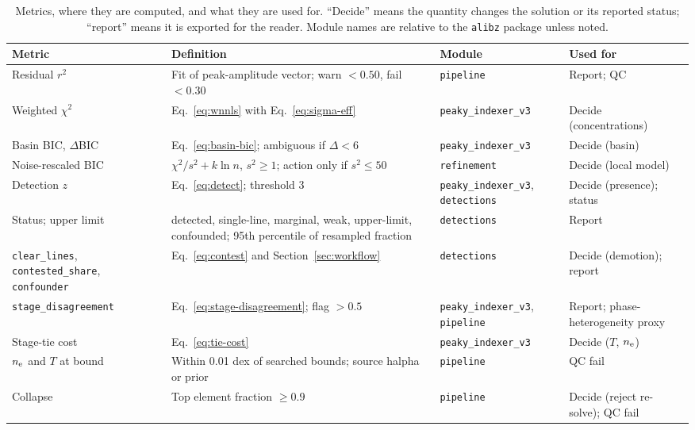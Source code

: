 \begin{table}[t]
\centering
\footnotesize
\setlength{\tabcolsep}{3pt}
\caption{Metrics, where they are computed, and what they are used for. ``Decide'' means the quantity changes the solution or its reported status; ``report'' means it is exported for the reader. Module names are relative to the \texttt{alibz} package unless noted.}
\label{tab:metrics}
\begin{tabular}{@{}p{2.6cm}p{5.0cm}p{2.9cm}p{2.9cm}@{}}
\toprule
Metric & Definition & Module & Used for \\
\midrule
Residual $r^2$ & Fit of peak-amplitude vector; warn $<0.50$, fail $<0.30$ & \texttt{pipeline} & Report; QC \\
Weighted $\chi^2$ & Eq.~\eqref{eq:wnnls} with Eq.~\eqref{eq:sigma-eff} & \texttt{peaky\_\allowbreak indexer\_\allowbreak v3} & Decide (concentrations) \\
Basin BIC, $\Delta$BIC & Eq.~\eqref{eq:basin-bic}; ambiguous if $\Delta<6$ & \texttt{peaky\_\allowbreak indexer\_\allowbreak v3} & Decide (basin) \\
Noise-rescaled BIC & $\chi^2/s^2+k\ln n$, $s^2\ge1$; action only if $s^2\le50$ & \texttt{refinement} & Decide (local model) \\
Detection $z$ & Eq.~\eqref{eq:detect}; threshold 3 & \texttt{peaky\_\allowbreak indexer\_\allowbreak v3}, \texttt{detections} & Decide (presence); status \\
Status; upper limit & detected, single-line, marginal, weak, upper-limit, confounded; 95th percentile of resampled fraction & \texttt{detections} & Report \\
\texttt{clear\_\allowbreak lines}, \texttt{contested\_\allowbreak share}, \texttt{confounder} & Eq.~\eqref{eq:contest} and Section~\ref{sec:workflow} & \texttt{detections} & Decide (demotion); report \\
\texttt{stage\_\allowbreak disagreement} & Eq.~\eqref{eq:stage-disagreement}; flag $>0.5$ & \texttt{peaky\_\allowbreak indexer\_\allowbreak v3}, \texttt{pipeline} & Report; phase-heterogeneity proxy \\
Stage-tie cost & Eq.~\eqref{eq:tie-cost} & \texttt{peaky\_\allowbreak indexer\_\allowbreak v3} & Decide ($T$, $n_{\mathrm{e}}$) \\
$n_{\mathrm{e}}$ and $T$ at bound & Within 0.01 dex of searched bounds; source halpha or prior & \texttt{pipeline} & QC fail \\
Collapse & Top element fraction $\ge0.9$ & \texttt{pipeline} & Decide (reject re-solve); QC fail \\

\end{tabular}
\end{table}
